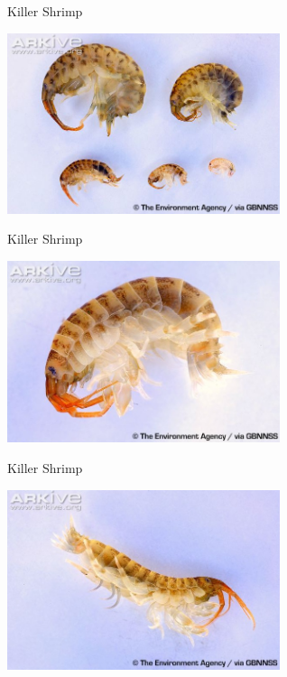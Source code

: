 \begin{frame}{Killer Shrimp}
\centerline{\includegraphics[width=8cm]{shrimpy1}}
\end{frame}

\begin{frame}{Killer Shrimp}
\centerline{\includegraphics[width=8cm]{shrimpy2}}
\end{frame}

\begin{frame}{Killer Shrimp}
\centerline{\includegraphics[width=8cm]{shrimpy3}}
\end{frame}

%

